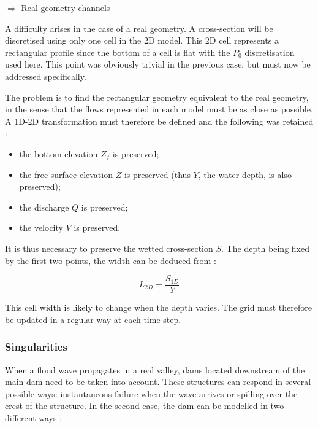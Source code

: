 \vspace{0.5cm}

$\Longrightarrow$ Real geometry channels

A difficulty arises in the case of a real geometry. A cross-section will be discretised using only one cell in the 2D model. This 2D cell represents a rectangular profile since the bottom of a cell is flat with the $P_0$ discretisation used here. This point was obviously trivial in the previous case, but must now be addressed specifically.

\vspace{0.5cm}

The problem is to find the rectangular geometry equivalent to the real geometry, in the sense that the flows represented in each model must be as close as possible. A 1D-2D transformation must therefore be defined and the following was retained :
\begin{itemize}
 \item the bottom elevation $Z_f$ is preserved;
 \item the free surface elevation $Z$ is preserved (thus $Y$, the water depth, is also preserved);
 \item the discharge $Q$ is preserved;
 \item the velocity $V$ is preserved.
\end{itemize}

\vspace{0.5cm}

It is thus necessary to preserve the wetted cross-section $S$. The depth being fixed by the first two points, the width can be deduced from :

\begin{equation}
 L_{2D} = \frac{S_{1D}}{Y}
\end{equation}

\vspace{0.5cm}

This cell width is likely to change when the depth varies. The grid must therefore be updated in a regular way at each time step.

\subsubsection{Singularities}

When a flood wave propagates in a real valley, dams located downstream of the main dam need to be taken into account. These structures can respond in several possible ways: instantaneous failure when the wave arrives or spilling over the crest of the structure. In the second case, the dam can be modelled in two different ways :

